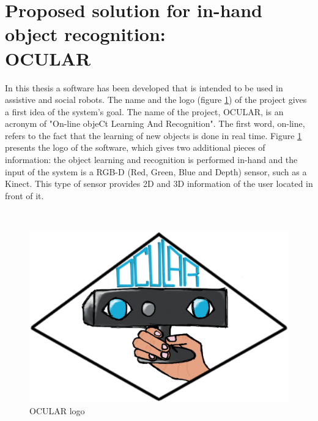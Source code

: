 \section{Proposed solution for in-hand object recognition: \\OCULAR}

In this thesis a software has been developed that is intended to be used in assistive and social robots.
The name and the logo (figure \ref{ocular_logo}) of the project gives a first idea of the system's goal. 
The name of the project, OCULAR, is an acronym of "On-line objeCt Learning And Recognition". 
The first word, on-line, refers to the fact that the learning of new objects is done in real time. %
Figure \ref{ocular_logo} presents the logo of the software, which gives two additional pieces of information: 
the object learning and recognition is performed in-hand and the input of the system is a RGB-D (Red, Green, Blue and Depth) sensor, such as a Kinect. 
This type of sensor provides 2D and 3D information of the user located in front of it. 

\\

\begin{figure}[H]
	\begin{center}
\includegraphics[scale=0.3]{img/ocular_logo.eps}
	\caption[OCULAR Logo]{OCULAR logo}
		\label{ocular_logo}
	\end{center}
\end{figure}

